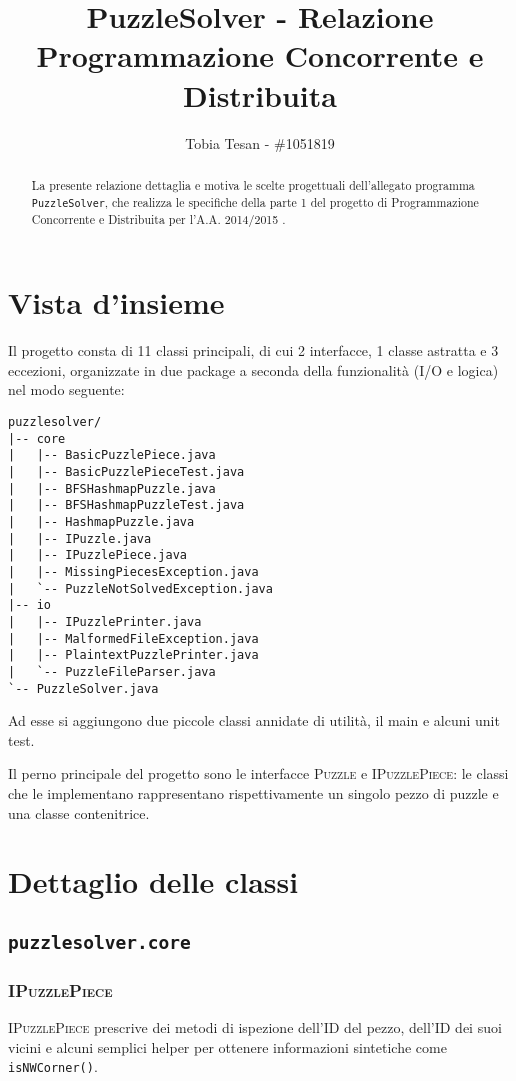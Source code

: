 \documentclass[a4paper]{article}
\title{PuzzleSolver - Relazione Programmazione Concorrente e Distribuita}
\author{Tobia Tesan - \#1051819}
\newcommand{\Classname}[1]{\textsc{#1}}
\newcommand{\Ifacename}[1]{\textsc{#1}}
\newcommand{\Methodname}[1]{\texttt{#1}}
\newcommand{\Pkgname}[1]{\texttt{#1}}
\begin{document}
\maketitle
\tableofcontents

\begin{abstract}
La presente relazione dettaglia e motiva le scelte progettuali dell'allegato programma \texttt{PuzzleSolver}, che realizza le specifiche della parte 1 del progetto di Programmazione Concorrente e Distribuita per l'A.A. 2014/2015 \cite{prspec}.
\end{abstract}

\section{Vista d'insieme}

Il progetto consta di 11 classi principali, di cui 2 interfacce, 1 classe astratta e 3 eccezioni, organizzate in due package a seconda della funzionalit\`a (I/O e logica) nel modo seguente:

\begin{verbatim}
puzzlesolver/
|-- core
|   |-- BasicPuzzlePiece.java
|   |-- BasicPuzzlePieceTest.java
|   |-- BFSHashmapPuzzle.java
|   |-- BFSHashmapPuzzleTest.java
|   |-- HashmapPuzzle.java
|   |-- IPuzzle.java
|   |-- IPuzzlePiece.java
|   |-- MissingPiecesException.java
|   `-- PuzzleNotSolvedException.java
|-- io
|   |-- IPuzzlePrinter.java
|   |-- MalformedFileException.java
|   |-- PlaintextPuzzlePrinter.java
|   `-- PuzzleFileParser.java
`-- PuzzleSolver.java
\end{verbatim}

Ad esse si aggiungono due piccole classi annidate di utilit\`a, il main e alcuni unit test.

Il perno principale del progetto sono le interfacce \Ifacename{Puzzle} e \Ifacename{IPuzzlePiece}: le classi che le implementano rappresentano rispettivamente un singolo pezzo di puzzle e una classe contenitrice.

\section{Dettaglio delle classi}
\subsection{\Pkgname{puzzlesolver.core}}
\subsubsection{\Classname{IPuzzlePiece}}
\Ifacename{IPuzzlePiece} prescrive dei metodi di ispezione dell'ID del pezzo, dell'ID dei suoi vicini e alcuni semplici helper per ottenere informazioni sintetiche come \Methodname{isNWCorner()}.
\end{document}
